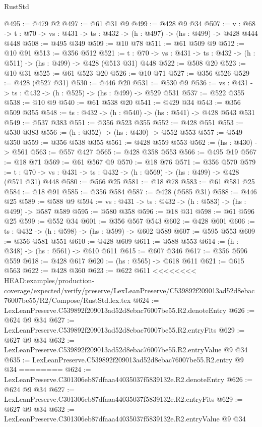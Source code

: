 \begin{lexlean}{RustStd}
\begin{coremodule}
{\begin{coremodule}
@495 := @479 @2
@497 := @61 @31 @9
@499 := @428 @9 @34
@507 := {v : @68} ->
  {t : @70} -> {vs : @431} -> {ts : @432} -> (h : @497) -> (hs : @499) -> @428 @444 @448
@508 := @495 @349
@509 := @10 @78
@511 := @61 @509 @9
@512 := @10 @91
@513 := @356 @512
@521 := {t : @70} -> {vs : @431} -> {ts : @432} -> (h : @511) -> (hs : @499) -> @428 (@513 @31) @448
@522 := @508 @20
@523 := @10 @31
@525 := @61 @523 @20
@526 := @10 @71
@527 := @356 @526
@529 := @428 (@527 @31)
@530 := @446 @20
@531 := @530 @9
@536 := {vs : @431} -> {ts : @432} -> (h : @525) -> (hs : @499) -> @529 @531
@537 := @522 @355
@538 := @10 @9
@540 := @61 @538 @20
@541 := @429 @34
@543 := @356 @509 @355
@548 := {ts : @432} -> (h : @540) -> (hs : @541) -> @428 @543 @531
@549 := @537 @383
@551 := @356 @523 @355
@552 := @428 @551
@553 := @530 @383
@556 := (h : @352) -> (hs : @430) -> @552 @553
@557 := @549 @350
@559 := @356 @538 @355
@561 := @428 @559 @553
@562 := (hs : @430) -> @561
@563 := @557 @427
@565 := @428 @358 @553
@566 := @495 @19
@567 := @18 @71
@569 := @61 @567 @9
@570 := @18 @76
@571 := @356 @570
@579 := {t : @70} -> {vs : @431} -> {ts : @432} -> (h : @569) -> (hs : @499) -> @428 (@571 @31) @448
@580 := @566 @25
@581 := @18 @78
@583 := @61 @581 @25
@584 := @18 @91
@585 := @356 @584
@587 := @428 (@585 @31)
@588 := @446 @25
@589 := @588 @9
@594 := {vs : @431} -> {ts : @432} -> (h : @583) -> (hs : @499) -> @587 @589
@595 := @580 @358
@596 := @18 @31
@598 := @61 @596 @25
@599 := @552 @34
@601 := @356 @567 @543
@602 := @428 @601
@606 := {ts : @432} -> (h : @598) -> (hs : @599) -> @602 @589
@607 := @595 @553
@609 := @356 @581 @551
@610 := @428 @609
@611 := @588 @553
@614 := (h : @348) -> (hs : @561) -> @610 @611
@615 := @607 @346
@617 := @356 @596 @559
@618 := @428 @617
@620 := (hs : @565) -> @618 @611
@621 := @615 @563
@622 := @428 @360
@623 := @622 @611
<<<<<<<< HEAD:examples/production-coverage/expected/verify/preserve/LexLeanPreserve/C539892f209013ad52d8ebac76007be55/R2/Compose/RustStd.lex.tex
@624 := LexLeanPreserve.C539892f209013ad52d8ebac76007be55.R2.denoteEntry
@626 := @624 @9 @34
@627 := LexLeanPreserve.C539892f209013ad52d8ebac76007be55.R2.entryFits
@629 := @627 @9 @34
@632 := LexLeanPreserve.C539892f209013ad52d8ebac76007be55.R2.entryValue @9 @34
@635 := LexLeanPreserve.C539892f209013ad52d8ebac76007be55.R2.entry @9 @34
========
@624 := LexLeanPreserve.C301306eb87dfaaa44035037f5839132e.R2.denoteEntry
@626 := @624 @9 @34
@627 := LexLeanPreserve.C301306eb87dfaaa44035037f5839132e.R2.entryFits
@629 := @627 @9 @34
@632 := LexLeanPreserve.C301306eb87dfaaa44035037f5839132e.R2.entryValue @9 @34

\end{coremodule}}
\end{coremodule}
\end{lexlean}
